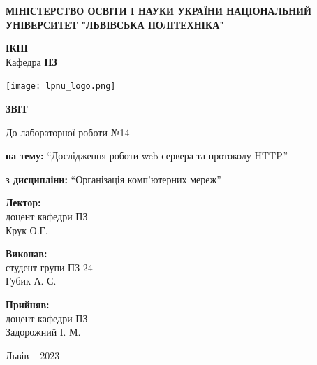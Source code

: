 \documentclass[12pt]{extarticle}
\begin{document}
\begin{titlepage}
    \begin{center}
        \textbf{\normalsize{\MakeUppercase{
            Міністерство Освіти і науки України
            Національний університет "Львівська політехніка"
        }}}

        \begin{flushright}
        \textbf{ІКНІ}\\
        Кафедра \textbf{ПЗ}
        \end{flushright}
        \vspace{15mm}

        \texttt{[image: lpnu\_logo.png]}

        \vspace*{\fill}

        \textbf{\normalsize{\MakeUppercase{Звіт}}}
            
        До лабораторної роботи №14

        \textbf{на тему:} “Дослідження роботи web-сервера та протоколу HTTP.”

        \textbf{з дисципліни:} “Організація комп'ютерних мереж”
            
        \vspace*{\fill}

        \begin{flushright}

            \textbf{Лектор:}\\
            доцент кафедри ПЗ\\
            Крук О.Г.\\
            \vspace{12pt}

            \textbf{Виконав:}\\
            студент групи ПЗ-24\\
            Губик А. С.\\
            \vspace{12pt}

            \textbf{Прийняв:}\\
            доцент кафедри ПЗ\\
            Задорожний І. М.\\
        \vspace{12pt}
        \end{flushright}

        Львів -- 2023
            
            
    \end{center}
\end{titlepage}
\end{document}
